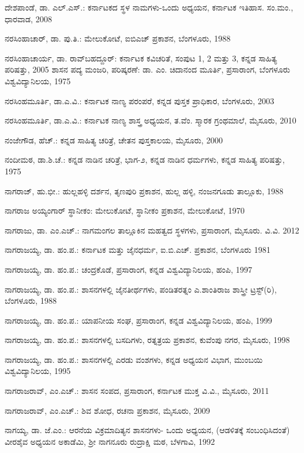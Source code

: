 \noindent
ದೇಶಪಾಂಡೆ, ಡಾ. ಎಲ್​.ಎಸ್​.: ಕರ್ನಾಟಕದ ಸ್ಥಳ ನಾಮಗಳು-ಒಂದು ಅಧ್ಯಯನ, ಕರ್ನಾಟಕ ಇತಿಹಾಸ. ಸಂ.ಮಂ., ಧಾರವಾಡ, 2008

\noindent
ನರಸಿಂಹಾಚಾರ್​, ಡಾ. ಪು.ತಿ.: ಮೇಲುಕೋಟೆ, ಐಬಿಎಚ್​ ಪ್ರಕಾಶನ, ಬೆಂಗಳೂರು, 1988

\noindent
ನರಸಿಂಹಾಚಾರ್ಯ, ಡಾ. ರಾವ್​ಬಹದ್ದೂರ್​: ಕರ್ನಾಟಕ ಕವಿಚರಿತೆ, ಸಂಪುಟ 1, 2 ಮತ್ತು 3, ಕನ್ನಡ ಸಾಹಿತ್ಯ ಪರಿಷತ್ತು, 2005 ಶಾಸನ ಪದ್ಯ ಮಂಜರಿ, ಪರಿಷ್ಕರಣೆ: ಡಾ. ಎಂ. ಚಿದಾನಂದ ಮೂರ್ತಿ, ಪ್ರಸಾರಾಂಗ, ಬೆಂಗಳೂರು ವಿಶ್ವವಿದ್ಯಾನಿಲಯ, 1975

\noindent
ನರಸಿಂಹಮೂರ್ತಿ, ಡಾ.ಎ.ವಿ.: ಕರ್ನಾಟಕ ನಾಣ್ಯ ಪರಂಪರೆ, ಕನ್ನಡ ಪುಸ್ತಕ ಪ್ರಾಧಿಕಾರ, ಬೆಂಗಳೂರು, 2003

\noindent
ನರಸಿಂಹಮೂರ್ತಿ, ಡಾ.ಎ.ವಿ.: ಕರ್ನಾಟಕ ನಾಣ್ಯ ಶಾಸ್ತ್ರ ಅಧ್ಯಯನ, ತ.ವೆಂ. ಸ್ಮಾರಕ ಗ್ರಂಥಮಾಲೆ, ಮೈಸೂರು, 2010

\noindent
ನಂಜೇಗೌಡ, ಹೆಚ್​.: ಕನ್ನಡ ಸಾಹಿತ್ಯ ಚರಿತ್ರೆ, ಚೇತನ ಪುಸ್ತಕಾಲಯ, ಮೈಸೂರು, 2000

\noindent
ನಂದೀಮಠ, ಡಾ.ಶಿ.ಚೆ.: ಕನ್ನಡ ನಾಡಿನ ಚರಿತ್ರೆ, ಭಾಗ-೨, ಕನ್ನಡ ನಾಡಿನ ಧರ್ಮಗಳು, ಕನ್ನಡ ಸಾಹಿತ್ಯ ಪರಿಷತ್ತು, 1975

\noindent
ನಾಗರಾಜ್​, ಹು.ಭೀ.: ಹುಲ್ಲಹಳ್ಳಿ ದರ್ಶನ, ತೃಣಪುರಿ ಪ್ರಕಾಶನ, ಹುಲ್ಲ ಹಳ್ಳಿ, ನಂಜನಗೂಡು ತಾಲ್ಲೂಕು, 1988

\noindent
ನಾಗರಾಜ ಅಯ್ಯಂಗಾರ್​ ಸ್ಥಾನೀಕಂ: ಮೇಲುಕೋಟೆ, ಸ್ಥಾನೀಕಂ ಪ್ರಕಾಶನ, ಮೇಲುಕೋಟೆ, 1970

\noindent
ನಾಗರಾಜು, ಡಾ. ಎಂ.ಎಚ್​.: ನಾಗಮಂಗಲ ತಾಲ್ಲೂಕಿನ ಮಹತ್ವದ ಸ್ಥಳಗಳು, ಪ್ರಸಾರಾಂಗ, ಮೈಸೂರು. ವಿ.ವಿ. 2012

\noindent
ನಾಗರಾಜಯ್ಯ, ಡಾ. ಹಂ.ಪ.: ಕರ್ನಾಟಕ ಮತ್ತು ಜೈನಧರ್ಮ, ಐ.ಬಿ.ಎಚ್​. ಪ್ರಕಾಶನ, ಬೆಂಗಳೂರು 1981

\noindent
ನಾಗರಾಜಯ್ಯ, ಡಾ. ಹಂ.ಪ.: ಚಂದ್ರಕೊಡೆ, ಪ್ರಸಾರಾಂಗ, ಕನ್ನಡ ವಿಶ್ವವಿದ್ಯಾನಿಲಯ, ಹಂಪಿ, 1997

\noindent
ನಾಗರಾಜಯ್ಯ, ಡಾ. ಹಂ.ಪ.: ಶಾಸನಗಳಲ್ಲಿ ಜೈನತೀರ್ಥಗಳು, ಪಂಡಿತರತ್ನಂ ಎ.ಶಾಂತಿರಾಜ ಶಾಸ್ತ್ರೀ ಟ್ರಸ್ಟ್​(ರಿ), ಬೆಂಗಳೂರು, 1988

\noindent
ನಾಗರಾಜಯ್ಯ, ಡಾ. ಹಂ.ಪ.: ಯಾಪನೀಯ ಸಂಘ, ಪ್ರಸಾರಾಂಗ, ಕನ್ನಡ ವಿಶ್ವವಿದ್ಯಾನಿಲಯ, ಹಂಪಿ, 1999

\noindent
ನಾಗರಾಜಯ್ಯ, ಡಾ. ಹಂ.ಪ.: ಶಾಸನಗಳಲ್ಲಿ ಬಸದಿಗಳು, ರತ್ನತ್ರಯ ಪ್ರಕಾಶನ, ಕುವೆಂಪು ನಗರ, ಮೈಸೂರು, 1998

\noindent
ನಾಗರಾಜಯ್ಯ, ಡಾ. ಹಂ.ಪ.: ಶಾಸನಗಳಲ್ಲಿ ಎರಡು ವಂಶಗಳು, ಕನ್ನಡ ಅಧ್ಯಯನ ವಿಭಾಗ, ಮುಂಬಯಿ ವಿಶ್ವವಿದ್ಯಾನಿಲಯ, 1995

\noindent
ನಾಗರಾಜರಾವ್​, ಎಂ.ಎಚ್​.: ಶಾಸನ ಸಂಪದ, ಪ್ರಸಾರಾಂಗ, ಕರ್ನಾಟಕ ಮುಕ್ತ ವಿ.ವಿ., ಮೈಸೂರು, 2011

\noindent
ನಾಗರಾಜರಾವ್​, ಎಂ.ಎಚ್​.: ಶಿವ ಶೋಧ, ರಚನಾ ಪ್ರಕಾಶನ, ಮೈಸೂರು, 2009

\noindent
ನಾಗಯ್ಯ, ಡಾ. ಜೆ.ಎಂ.: ಆರನೆಯ ವಿಕ್ರಮಾದಿತ್ಯನ ಶಾಸನಗಳು- ಒಂದು ಅಧ್ಯಯನ, (ಆಡಳಿತಕ್ಕೆ ಸಂಬಂಧಿಸಿದಂತೆ) ವೀರಶೈವ ಅಧ್ಯಯನ ಅಕಾಡೆಮಿ, ಶ‍್ರೀ ನಾಗನೂರು ರುದ್ರಾಕ್ಷಿ ಮಠ, ಬೆಳಗಾವಿ, 1992

